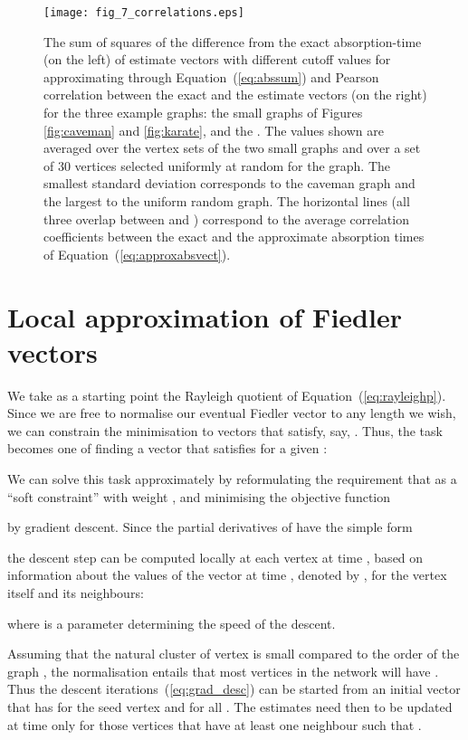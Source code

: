 \documentclass{article}
\begin{document}
\begin{figure}
\centerline{\texttt{[image: fig\_7\_correlations.eps]}}
\caption{The sum of squares of the difference from the exact
  absorption-time (on the left) of estimate vectors with different
  cutoff values for approximating through Equation~(\ref{eq:abssum}) and
  Pearson correlation between the exact and the estimate vectors (on
  the right) for the three example graphs: the small graphs of Figures
  \ref{fig:caveman} and \ref{fig:karate}, and the . The values shown are averaged over the vertex sets of the two
  small graphs and over a set of 30 vertices selected uniformly at
  random for the  graph. The smallest standard
  deviation corresponds to the caveman graph and the largest to the
  uniform random graph. The horizontal lines (all three overlap
  between  and ) correspond to the average correlation
  coefficients between the exact and the approximate absorption times
  of Equation~(\ref{eq:approxabsvect}).}
\label{fig:absconv}
\end{figure}

\section{Local approximation of Fiedler vectors}

We take as a starting point the Rayleigh quotient of
Equation~(\ref{eq:rayleighp}). Since we are free to normalise our
eventual Fiedler vector  to any length we wish, we can constrain
the minimisation to vectors  that satisfy, say, .  Thus, the task becomes one of finding a vector  that
satisfies for a given :

We can solve this task approximately by reformulating the requirement
that  as a ``soft constraint'' with weight ,
and minimising the objective function

by gradient descent. Since the partial derivatives of  have
the simple form

the descent step can be computed locally at each vertex at time , based on information about the values of the vector  at time
, denoted by , for the vertex itself and its
neighbours:

where  is a parameter determining the speed of the descent.

Assuming that the natural cluster of vertex  is small compared to
the order of the graph , the normalisation  entails
that most vertices  in the network will have .  Thus
the descent iterations~(\ref{eq:grad_desc}) can be started from an
initial vector  that has  for the
seed vertex  and  for all .
The estimates need then to be updated at time  only for those
vertices  that have at least one neighbour  such that
.
\end{document}
